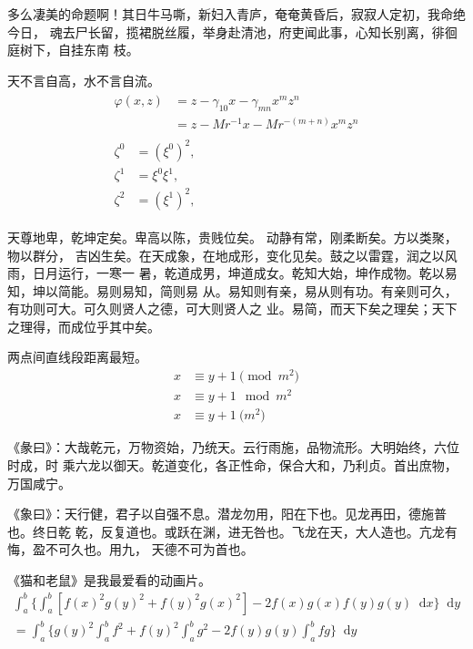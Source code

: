 多么凄美的命题啊！其日牛马嘶，新妇入青庐，奄奄黄昏后，寂寂人定初，我命绝今日，
魂去尸长留，揽裙脱丝履，举身赴清池，府吏闻此事，心知长别离，徘徊庭树下，自挂东南
枝。

\begin{remark}
天不言自高，水不言自流。
\begin{gather*}
\begin{split}
\varphi(x,z)
&=z-\gamma_{10}x-\gamma_{mn}x^mz^n\\
&=z-Mr^{-1}x-Mr^{-(m+n)}x^mz^n
\end{split}\\[6pt]
\begin{align} \zeta^0&=(\xi^0)^2,\\
\zeta^1 &=\xi^0\xi^1,\\
\zeta^2 &=(\xi^1)^2,
\end{align}
\end{gather*}
\end{remark}

天尊地卑，乾坤定矣。卑高以陈，贵贱位矣。 动静有常，刚柔断矣。方以类聚，物以群分，
吉凶生矣。在天成象，在地成形，变化见矣。鼓之以雷霆，润之以风雨，日月运行，一寒一
暑，乾道成男，坤道成女。乾知大始，坤作成物。乾以易知，坤以简能。易则易知，简则易
从。易知则有亲，易从则有功。有亲则可久，有功则可大。可久则贤人之德，可大则贤人之
业。易简，而天下矣之理矣；天下之理得，而成位乎其中矣。

\begin{axiom}
两点间直线段距离最短。
\begin{align}
x&\equiv y+1\pmod{m^2}\\
x&\equiv y+1\mod{m^2}\\
x&\equiv y+1\pod{m^2}
\end{align}
\end{axiom}

《彖曰》：大哉乾元，万物资始，乃统天。云行雨施，品物流形。大明始终，六位时成，时
乘六龙以御天。乾道变化，各正性命，保合大和，乃利贞。首出庶物，万国咸宁。

《象曰》：天行健，君子以自强不息。潜龙勿用，阳在下也。见龙再田，德施普也。终日乾
乾，反复道也。或跃在渊，进无咎也。飞龙在天，大人造也。亢龙有悔，盈不可久也。用九，
天德不可为首也。 　　

\newcommand\dif{\mathop{}\!\mathrm{d}}
\begin{lemma}
《猫和老鼠》是我最爱看的动画片。
\begin{multline*}%
\int_a^b\biggl\{\int_a^b[f(x)^2g(y)^2+f(y)^2g(x)^2]
 -2f(x)g(x)f(y)g(y)\dif x\biggr\}\dif y \\
 =\int_a^b\biggl\{g(y)^2\int_a^bf^2+f(y)^2
  \int_a^b g^2-2f(y)g(y)\int_a^b fg\biggr\}\dif y
\end{multline*}
\end{lemma}

